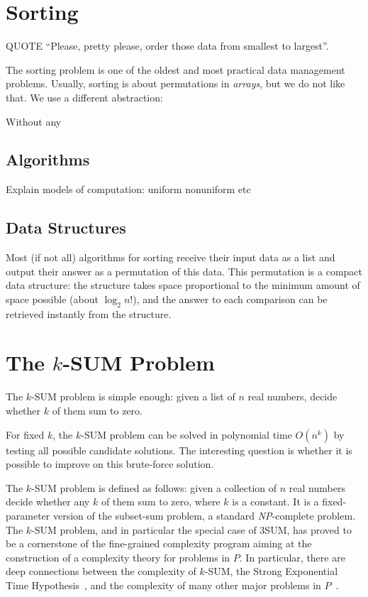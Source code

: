 \section{Sorting}

QUOTE ``Please, pretty please, order those data from smallest to largest''.

The sorting problem is one of the oldest and most practical data management
problems.
%
Usually, sorting is about permutations in \emph{arrays}, but we do not like
that. We use a different abstraction:



Without any

\subsection{Algorithms}
Explain models of computation: uniform nonuniform etc

\subsection{Data Structures}

Most (if not all) algorithms for sorting receive their input data as a list and
output their answer as a permutation of this data. This permutation is a
compact data structure: the structure takes space proportional to the minimum
amount of space possible (about \(\log_2 n!\)), and the answer to each
comparison can be retrieved instantly from the structure.


\section{The \(k\)-SUM Problem}

The \(k\)-SUM problem is simple enough: given a list of \(n\) real numbers,
decide whether \(k\) of them sum to zero.



For fixed \(k\), the \(k\)-SUM problem can be solved in polynomial time
\(O(n^k)\) by testing all possible candidate solutions.
The interesting question is whether it is possible to improve on
this brute-force solution.

The \(k\)-SUM problem is defined as follows: given a collection of $n$ real
numbers decide whether any $k$ of them sum to zero, where $k$ is a constant.
It is a fixed-parameter version of the subset-sum problem, a standard \textit{NP}-complete
problem. The \(k\)-SUM problem, and in particular the special case of 3SUM,
has proved to be a cornerstone of the fine-grained complexity program aiming at
the construction of a complexity theory for problems in $P$. In particular,
there are deep connections between the complexity of \(k\)-SUM, the Strong
Exponential Time Hypothesis~\cite{PW10,CGIMPS15}, and the complexity of many
other major problems in
$P$~\cite{GO95,BH99,MO01,P10,ACLL14,AVW14,GP14,KPP14,ALW14,AWY15,CL15}.

